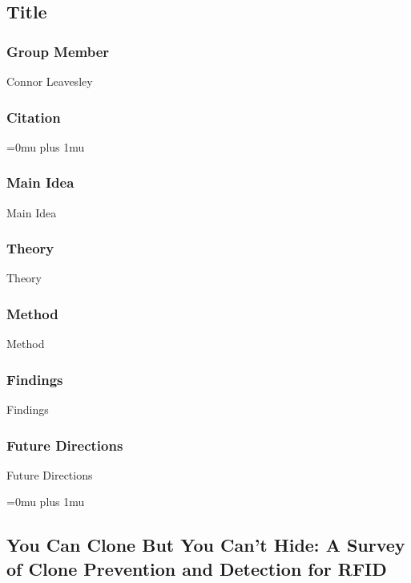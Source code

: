 \noindent
\subsection{Title}

\subsubsection{Group Member}

\noindent
Connor Leavesley

\noindent
\subsubsection{Citation}

\Urlmuskip=0mu plus 1mu\relax

\subsubsection{Main Idea}

\noindent
Main Idea

\subsubsection{Theory}

\noindent
Theory

\subsubsection{Method}

\noindent
Method

\subsubsection{Findings}

\noindent
Findings

\subsubsection{Future Directions}

\noindent
Future Directions 

\Urlmuskip=0mu plus 1mu\relax

\noindent
\subsection{{Y}ou {C}an {C}lone {B}ut {Y}ou {C}an't {H}ide: {A} {S}urvey of {C}lone {P}revention and {D}etection for {RFID}}


